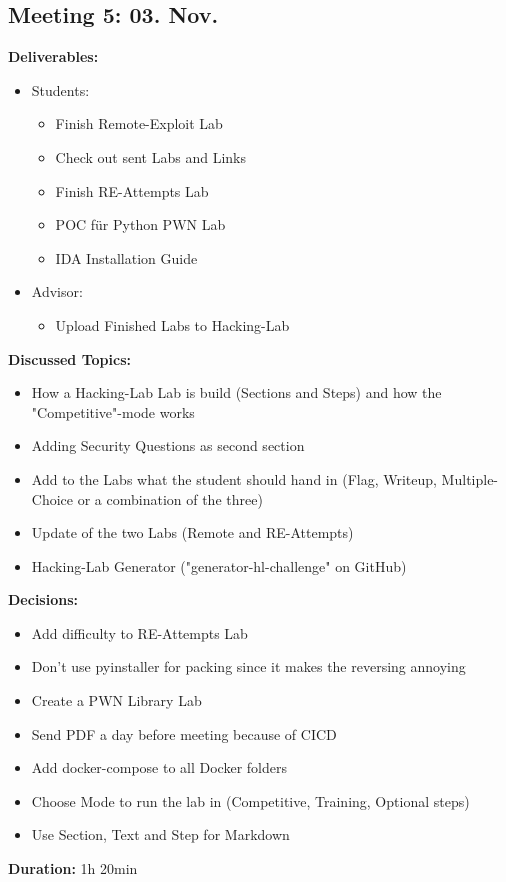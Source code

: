 \subsection*{Meeting 5: 03. Nov.}
\textbf{Deliverables:}
\begin{itemize}
    \item Students:
    \begin{itemize}
        \item Finish Remote-Exploit Lab
        \item Check out sent Labs and Links
        \item Finish RE-Attempts Lab
        \item POC für Python PWN Lab
        \item IDA Installation Guide
    \end{itemize}
    \item Advisor:
    \begin{itemize}
        \item Upload Finished Labs to Hacking-Lab
    \end{itemize}
\end{itemize} 
\textbf{Discussed Topics:}
\begin{itemize}
    \item How a Hacking-Lab Lab is build (Sections and Steps) and how the "Compe\-titive"-mode works
    \item Adding Security Questions as second section
    \item Add to the Labs what the student should hand in (Flag, Writeup, Multiple-Choice or a combination of the three)
    \item Update of the two Labs (Remote and RE-Attempts)
    \item Hacking-Lab Generator ("generator-hl-challenge" on GitHub)
\end{itemize}
\textbf{Decisions:}
\begin{itemize}
    \item Add difficulty to RE-Attempts Lab
    \item Don't use pyinstaller for packing since it makes the reversing annoying
    \item Create a PWN Library Lab
    \item Send PDF a day before meeting because of CICD
    \item Add docker-compose to all Docker folders
    \item Choose Mode to run the lab in (Competitive, Training, Optional steps)
    \item Use Section, Text and Step for Markdown
\end{itemize}
\textbf{Duration:} 1h 20min

